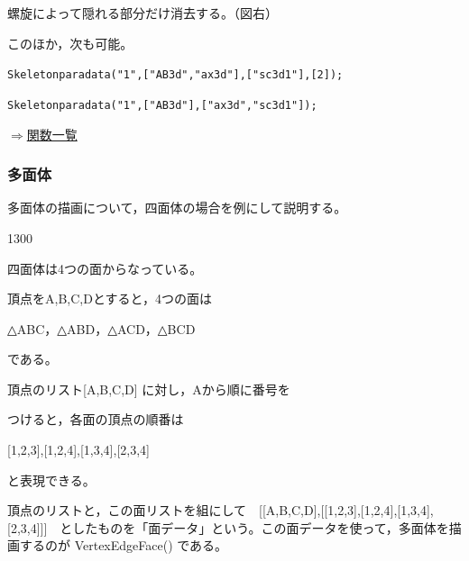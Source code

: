 \documentclass[papersize,a4paper,12pt,uplatex]{jsarticle}
\begin{document}
\begin{description}
螺旋によって隠れる部分だけ消去する。（図右）

\begin{center}   
  \end{center}

このほか，次も可能。

\hspace{10mm} \verb|Skeletonparadata("1",["AB3d","ax3d"],["sc3d1"],[2]);|

\hspace{10mm} \verb|Skeletonparadata("1",["AB3d"],["ax3d","sc3d1"]);|


\end{description}

\begin{flushright} \hyperlink{functionlist}{$\Rightarrow$関数一覧}\end{flushright}

\subsubsection{多面体}

多面体の描画について，四面体の場合を例にして説明する。

\begin{layer}{130}{0}
\end{layer}

四面体は4つの面からなっている。

頂点をA,B,C,Dとすると，4つの面は

\hspace{10mm} △ABC，△ABD，△ACD，△BCD

である。


頂点のリスト[A,B,C,D] に対し，Aから順に番号を

つけると，各面の頂点の順番は

\hspace{20mm}[1,2,3],[1,2,4],[1,3,4],[2,3,4]

と表現できる。

頂点のリストと，この面リストを組にして　[[A,B,C,D],[[1,2,3],[1,2,4],[1,3,4],[2,3,4]]]　としたものを「面データ」という。この面データを使って，多面体を描画するのが VertexEdgeFace() である。
\end{document}

